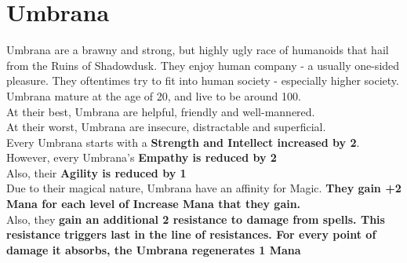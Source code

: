\section{Umbrana}
Umbrana are a brawny and strong, but highly ugly race of humanoids that hail from the Ruins of Shadowdusk. They enjoy human company - a usually one-sided pleasure. They oftentimes try to fit into human society - especially higher society.\\
Umbrana mature at the age of 20, and live to be around 100.\\
At their best, Umbrana are helpful, friendly and well-mannered.\\
At their worst, Umbrana are insecure, distractable and superficial.\\
Every Umbrana starts with a \textbf{Strength and Intellect increased by 2}.\\
However, every Umbrana's \textbf{Empathy is reduced by 2}\\
Also, their \textbf{Agility is reduced by 1}\\
Due to their magical nature, Umbrana have an affinity for Magic. \textbf{They gain +2 Mana for each level of Increase Mana that they gain.}\\
Also, they \textbf{gain an additional 2 resistance to damage from spells. This resistance triggers last in the line of resistances. For every point of damage it absorbs, the Umbrana regenerates 1 Mana}\\